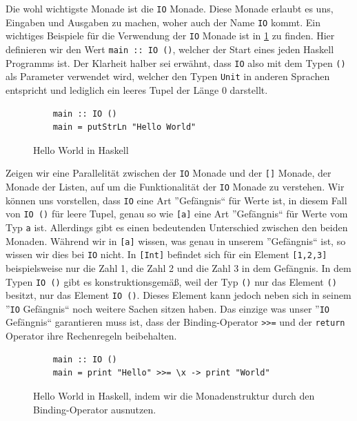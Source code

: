 \documentclass{hhuarticle}
\theoremstyle{definition}
\theoremstyle{theorem}
\begin{document}
  Die wohl wichtigste Monade ist die \verb|IO| Monade. Diese Monade
  erlaubt es uns, Eingaben und Ausgaben zu machen, woher auch der
  Name \verb|IO| kommt. Ein wichtiges Beispiele für die Verwendung der
  \verb|IO| Monade ist in \cref{fig:helloworld} zu finden. Hier definieren
  wir den Wert \verb|main :: IO ()|, welcher der Start eines jeden
  Haskell Programms ist. Der Klarheit halber sei erwähnt, dass \verb|IO|
  also mit dem Typen \verb|()| als Parameter verwendet wird, welcher
  den Typen \verb|Unit| in anderen Sprachen entspricht und lediglich
  ein leeres Tupel der Länge 0 darstellt.

  \begin{figure}[h]
    \begin{lstlisting}
    main :: IO ()
    main = putStrLn "Hello World"
    \end{lstlisting}
    \caption{Hello World in Haskell}%
    \label{fig:helloworld}
  \end{figure}

  Zeigen wir eine Parallelität zwischen der \verb|IO| Monade und der
  \verb|[]| Monade, der Monade der Listen, auf um die Funktionalität
  der \verb|IO| Monade zu verstehen. Wir können uns vorstellen, dass
  \verb|IO| eine Art ''Gefängnis`` für Werte ist, in diesem Fall 
  von \verb|IO ()| für leere Tupel, genau so wie \verb|[a]| eine Art
  ''Gefängnis`` für Werte vom Typ \verb|a| ist. Allerdings gibt es einen
  bedeutenden Unterschied zwischen den beiden Monaden. Während wir
  in \verb|[a]| wissen, was genau in unserem ''Gefängnis`` ist, so
  wissen wir dies bei \verb|IO| nicht. In \verb|[Int]| befindet sich
  für ein Element \verb|[1,2,3]| beispielsweise nur die Zahl 1, die Zahl
  2 und die Zahl 3 in dem Gefängnis. In dem Typen \verb|IO ()|
  gibt es konstruktionsgemäß, weil der Typ \verb|()| nur das Element \verb|()|
  besitzt, nur das Element \verb|IO ()|. Dieses Element kann jedoch
  neben sich in seinem ''\verb|IO| Gefängnis`` noch weitere Sachen sitzen haben.
  Das einzige was unser ''\verb|IO| Gefängnis`` garantieren muss ist, dass
  der Binding-Operator \verb|>>=| und der \verb|return| Operator
  ihre Rechenregeln beibehalten.

  \begin{figure}[h]
    \begin{lstlisting}
    main :: IO ()
    main = print "Hello" >>= \x -> print "World"
    \end{lstlisting}
    \caption{Hello World in Haskell, indem wir die Monadenstruktur durch den Binding-Operator ausnutzen.}%
    \label{fig:ioexamples}
  \end{figure}
\end{document}
